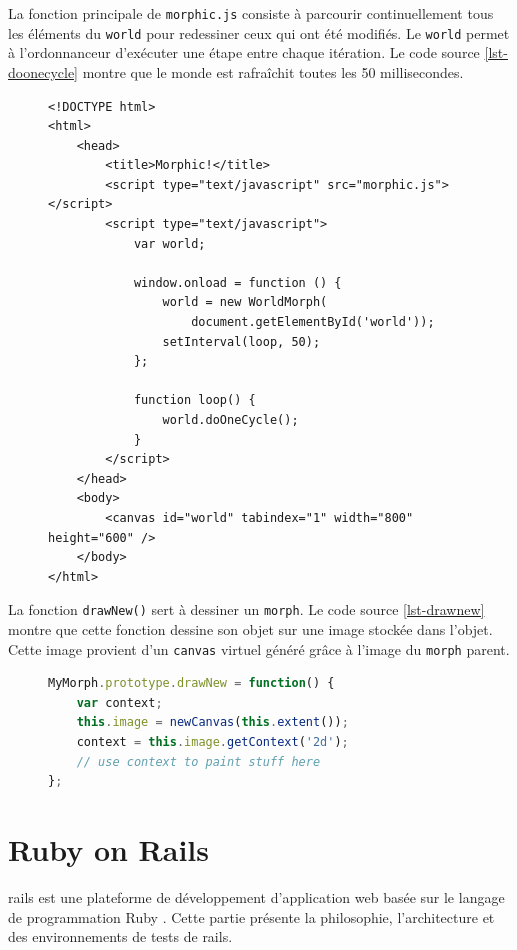 La fonction principale de \texttt{morphic.js} consiste à parcourir continuellement tous les éléments du \texttt{world} pour redessiner ceux qui ont été modifiés. Le \texttt{world} permet à l'ordonnanceur d'exécuter une étape entre chaque itération. Le code source \ref{lst-doonecycle} montre que le monde est rafraîchit toutes les 50 millisecondes.
\begin{figure}
\begin{lstlisting}[caption={Exemple d'utilisation de \texttt{morphic.js}},label=lst-doonecycle,language=HTML5,alsolanguage=JavaScript]
<!DOCTYPE html>
<html>
    <head>
        <title>Morphic!</title>
        <script type="text/javascript" src="morphic.js"></script>
        <script type="text/javascript">
            var world;

            window.onload = function () {
                world = new WorldMorph(
                    document.getElementById('world'));
                setInterval(loop, 50);
            };

            function loop() {
                world.doOneCycle();
            }
        </script>
    </head>
    <body>
        <canvas id="world" tabindex="1" width="800" height="600" />
    </body>
</html>
\end{lstlisting}
\end{figure}
La fonction \texttt{drawNew()} sert à dessiner un \texttt{morph}. Le code source \ref{lst-drawnew} montre que cette fonction dessine son objet sur une image stockée dans l'objet. Cette image provient d'un \texttt{canvas} virtuel généré grâce à l'image du \texttt{morph} parent.

\begin{figure}
\begin{lstlisting}[caption={Modèle pour la fonction \texttt{drawNew()}},label=lst-drawnew,language=JavaScript]
MyMorph.prototype.drawNew = function() {
    var context;
    this.image = newCanvas(this.extent());
    context = this.image.getContext('2d');
    // use context to paint stuff here
};
\end{lstlisting}
\end{figure}

\section{Ruby on Rails}
\label{rails}
\gls{rails} \cite{rails} est une plateforme de développement d'application web basée sur le langage de programmation Ruby \cite{ruby}. Cette partie présente la philosophie, l'architecture et des environnements de tests de \gls{rails}.

